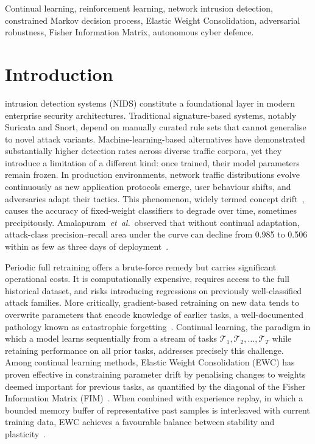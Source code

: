 \documentclass[journal]{IEEEtran}
\theoremstyle{definition}
\theoremstyle{remark}
\begin{document}
\begin{IEEEkeywords}
Continual learning, reinforcement learning, network intrusion detection, constrained Markov decision process, Elastic Weight Consolidation, adversarial robustness, Fisher Information Matrix, autonomous cyber defence.
\end{IEEEkeywords}

\section{Introduction}
\label{sec:intro}

 intrusion detection systems (NIDS) constitute a foundational layer in modern enterprise security architectures. Traditional signature-based systems, notably Suricata and Snort, depend on manually curated rule sets that cannot generalise to novel attack variants. Machine-learning-based alternatives have demonstrated substantially higher detection rates across diverse traffic corpora, yet they introduce a limitation of a different kind: once trained, their model parameters remain frozen. In production environments, network traffic distributions evolve continuously as new application protocols emerge, user behaviour shifts, and adversaries adapt their tactics. This phenomenon, widely termed concept drift~\cite{gama2014survey}, causes the accuracy of fixed-weight classifiers to degrade over time, sometimes precipitously. Amalapuram~\textit{et~al.}\ observed that without continual adaptation, attack-class precision--recall area under the curve can decline from 0.985 to 0.506 within as few as three days of deployment~\cite{amalapuram2024soul}.

Periodic full retraining offers a brute-force remedy but carries significant operational costs. It is computationally expensive, requires access to the full historical dataset, and risks introducing regressions on previously well-classified attack families. More critically, gradient-based retraining on new data tends to overwrite parameters that encode knowledge of earlier tasks, a well-documented pathology known as catastrophic forgetting~\cite{kirkpatrick2017ewc}. Continual learning, the paradigm in which a model learns sequentially from a stream of tasks $\mathcal{T}_1, \mathcal{T}_2, \ldots, \mathcal{T}_T$ while retaining performance on all prior tasks, addresses precisely this challenge. Among continual learning methods, Elastic Weight Consolidation (EWC) has proven effective in constraining parameter drift by penalising changes to weights deemed important for previous tasks, as quantified by the diagonal of the Fisher Information Matrix (FIM)~\cite{kirkpatrick2017ewc}. When combined with experience replay, in which a bounded memory buffer of representative past samples is interleaved with current training data, EWC achieves a favourable balance between stability and plasticity~\cite{amalapuram2023augmented}.
\end{document}
